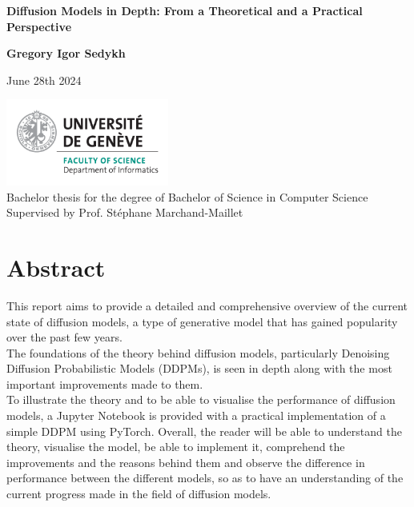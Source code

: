 \documentclass[twoside]{article}
\numberwithin{equation}{section}
\numberwithin{figure}{section}
\begin{document}
\begin{titlepage}
  \begin{center}
      \vspace*{1cm}

      \LARGE
      \textbf{Diffusion Models in Depth: From a Theoretical and a Practical Perspective}

      \vspace{1.5cm}

      \Large
      \textbf{Gregory Igor Sedykh}
      \vspace{0.8cm}

      \normalsize
      June 28th 2024

      \vfill

      \includegraphics[width=0.4\textwidth]{images/informatics_en.png} \\

      Bachelor thesis for the degree of Bachelor of Science in Computer Science \\
      Supervised by Prof. Stéphane Marchand-Maillet     

      \vspace{0.8cm}
           
  \end{center}
\end{titlepage}

\newpage
\section*{Abstract}

This report aims to provide a detailed and comprehensive overview of the current state of diffusion models, a type of generative model that has gained popularity over the past few years. \\
The foundations of the theory behind diffusion models, particularly Denoising Diffusion Probabilistic Models (DDPMs), is seen in depth along with the most important improvements made to them. \\
To illustrate the theory and to be able to visualise the performance of diffusion models, a Jupyter Notebook is provided with a practical implementation of a simple DDPM using PyTorch.
Overall, the reader will be able to understand the theory, visualise the model, be able to implement it, comprehend the improvements and the reasons behind them and observe the difference in performance between the different models, so as to have an understanding of the current progress made in the field of diffusion models.
\end{document}
